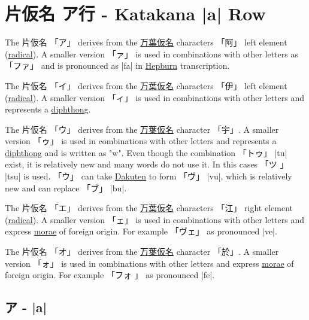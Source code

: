 \section{片仮名 ア行 - Katakana |a| Row}  \label{sec:KatakanaARow}


 The 片仮名 {「ア」} derives from the
\hyperref[sec:Manyogana]{万葉仮名} characters {「阿」} left element
(\hyperref[sec:Radical]{radical}).  A smaller version {「ァ」} is used in
combinations with other letters as {「ファ」} and is pronounced as |fa| in
\hyperref[sec:Hepburn]{Hepburn} transcription.

 The 片仮名 {「イ」} derives from the
\hyperref[sec:Manyogana]{万葉仮名} characters {「伊」} left element
(\hyperref[sec:Radical]{radical}).  A smaller version {「ィ」} is used in
combinations with other letters and represents a
\hyperref[sec:Diphthong]{diphthong}. 

 The 片仮名 {「ウ」} derives from the
\hyperref[sec:Manyogana]{万葉仮名} character {「宇」}. A smaller version
{「ゥ」} is used in combinations with other letters and represents a
\hyperref[sec:Diphthong]{diphthong} and is written as "w". Even though the
combination {「トゥ」} |tu| exist, it is relatively new and many words do not
use it. In this cases {「ツ 」} |tsu| is used. {「ウ」} can take
\hyperref[sec:Dakuten]{Dakuten} to form {「ヴ」} |vu|, which is relatively new
and can replace {「ブ」} |bu|. 

\newpage 

 The 片仮名 {「エ」} derives from the
\hyperref[sec:Manyogana]{万葉仮名} characters {「江」} right element
(\hyperref[sec:Radical]{radical}). A smaller version {「ェ」} is used in
combinations with other letters and express \hyperref[sec:Mora]{morae} of
foreign origin. For example {「ヴェ」} as pronounced |ve|.

 The 片仮名 {「オ」} derives from the
\hyperref[sec:Manyogana]{万葉仮名} character {「於」}. A smaller version
{「ォ」} is used in combinations with other letters and express
\hyperref[sec:Mora]{morae} of foreign origin. For example {「フォ 」} as
pronounced |fe|.

\newpage


\subsection{ア - |a|} \label{sec:KatakanaA}

